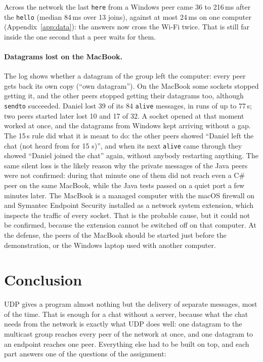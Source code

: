 \documentclass[11pt,a4paper]{article}
\newcommand{\code}[1]{{\frenchspacing\texttt{#1}}}
\begin{document}
Across the network the last \code{here} from a Windows peer came 36 to 216\,ms after the
\code{hello} (median 84\,ms over 13 joins), against at most 24\,ms on one computer
(Appendix~\ref{app:data}): the answers now cross the Wi-Fi twice. That is still far inside the one
second that a peer waits for them.

\paragraph{Datagrams lost on the MacBook.} The log shows whether a datagram of the group left the
computer: every peer gets back its own copy (``own datagram''). On the MacBook some sockets stopped
getting it, and the other peers stopped getting their datagrams too, although \code{sendto}
succeeded. Daniel lost 39 of its 84 \code{alive} messages, in runs of up to 77\,s; two peers started
later lost 10 and 17 of 32. A socket opened at that moment worked at once, and the datagrams from
Windows kept arriving without a gap. The 15\,s rule did what it is meant to do: the other peers
showed ``Daniel left the chat (not heard from for 15 s)'', and when its next \code{alive} came
through they showed ``Daniel joined the chat'' again, without anybody restarting anything. The same
silent loss is the likely reason why the private messages of the Java peers were not confirmed:
during that minute one of them did not reach even a C\# peer on the same MacBook, while the Java
tests passed on a quiet port a few minutes later. The MacBook is a managed computer with the macOS
firewall on and Symantec Endpoint Security installed as a network system extension, which inspects
the traffic of every socket. That is the probable cause, but it could not be confirmed, because the
extension cannot be switched off on that computer. At the defense, the peers of the MacBook should be started just before the
demonstration, or the Windows laptop used with another computer.


\section{Conclusion}

UDP gives a program almost nothing but the delivery of separate messages, most of the time. That is
enough for a chat without a server, because what the chat needs from the network is exactly what UDP
does well: one datagram to the multicast group reaches every peer of the network at once, and one
datagram to an endpoint reaches one peer. Everything else had to be built on top, and each part
answers one of the questions of the assignment:
\end{document}
